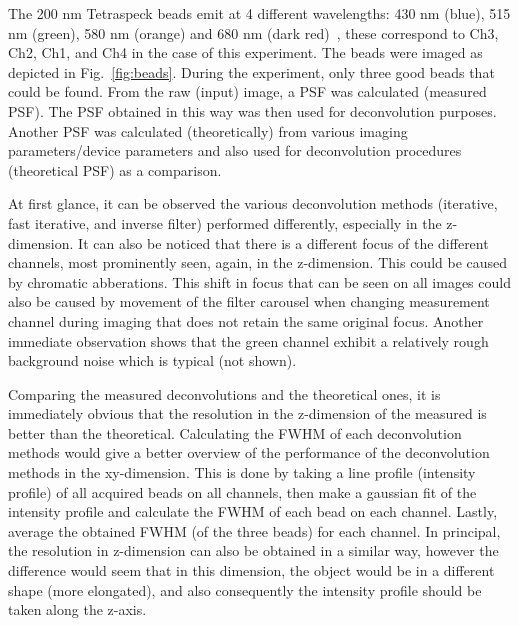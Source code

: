 The 200 nm Tetraspeck beads emit at 4 different wavelengths: 430 nm (blue), 515 nm (green), 580 nm (orange) and 680 nm (dark red)~\cite{Tetra}, these correspond to Ch3, Ch2, Ch1, and Ch4 in the case of this experiment. 
The beads were imaged as depicted in Fig.~\ref{fig:beads}. During the experiment, only three good beads that could be found. 
From the raw (input) image, a PSF was calculated (measured PSF). 
The PSF obtained in this way was then used for deconvolution purposes. Another PSF was calculated (theoretically) from various imaging parameters/device parameters and also used for deconvolution procedures (theoretical PSF) as a comparison. 

At first glance, it can be observed the various deconvolution methods (iterative, fast iterative, and inverse filter) performed differently, especially in the z-dimension. 
It can also be noticed that there is a different focus of the different channels, most prominently seen, again, in the z-dimension. 
This could be caused by chromatic abberations. 
This shift in focus that can be seen on all images could also be caused by movement of the filter carousel when changing measurement channel during imaging that does not retain the same original focus. 
Another immediate observation shows that the green channel exhibit a relatively rough background noise which is typical (not shown).

Comparing the measured deconvolutions and the theoretical ones, it is immediately obvious that the resolution in the z-dimension of the measured is better than the theoretical. 
Calculating the FWHM of each deconvolution methods would give a better overview of the performance of the deconvolution methods in the xy-dimension. 
This is done by taking a line profile (intensity profile) of all acquired beads on all channels, then make a gaussian fit of the intensity profile and calculate the FWHM of each bead on each channel. 
Lastly, average the obtained FWHM (of the three beads) for each channel. 
In principal, the resolution in z-dimension can also be obtained in a similar way, however the difference would seem that in this dimension, the object would be in a different shape (more elongated), and also consequently the intensity profile should be taken along the z-axis.

